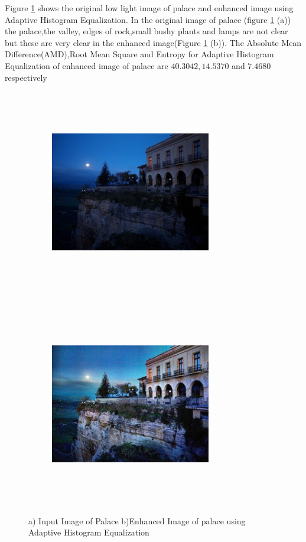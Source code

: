 Figure \ref{fig:palaceAHE} shows the original low light image of palace and enhanced image using Adaptive Histogram Equalization. In the original image of palace (figure \ref{fig:palaceAHE} (a))  the palace,the valley, edges of rock,small bushy plants and lamps are not clear but these are very clear in the enhanced image(Figure \ref{fig:palaceAHE} (b)). The Absolute Mean Difference(AMD),Root Mean Square and Entropy for Adaptive Histogram Equalization of enhanced image of palace are $40.3042, 14.5370$ and $7.4680$ respectively      


\begin{figure}[!htb]
	\begin{subfigure}{8cm}
		\centering    
    	\includegraphics[width=7cm,height=9cm,keepaspectratio]{images/ch5/palace_input.jpg}
    	\caption{} 
    \end{subfigure}
  	\begin{subfigure}{6cm}
  		\centering
  		\includegraphics[width=7cm,height=9cm,keepaspectratio]{images/ch5/palace_adapt_hist.jpg}
   		\caption{}
  	\end{subfigure}
  	\caption{a) Input Image of Palace b)Enhanced Image of palace using Adaptive Histogram Equalization}
  	\label{fig:palaceAHE}
\end{figure}


